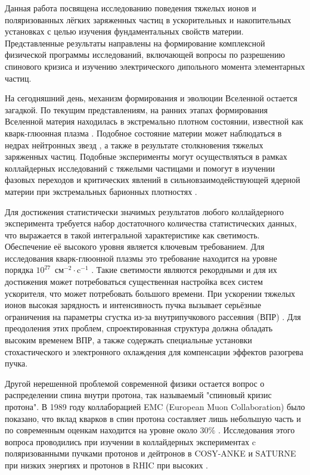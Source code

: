 \par	Данная работа посвящена исследованию поведения тяжелых ионов и поляризованных лёгких заряженных частиц в ускорительных и накопительных установках с целью изучения фундаментальных свойств материи. Представленные результаты направлены на формирование комплексной физической программы исследований, включающей вопросы по разрешению спинового кризиса и изучению электрического дипольного момента элементарных частиц.

\par	На сегодняшний день, механизм формирования и эволюции Вселенной остается загадкой. По текущим представлениям, на ранних этапах формирования Вселенной материя находилась в экстремально плотном состоянии, известной как кварк-глюонная плазма \cite{phase_transition_universe}. Подобное состояние материи может наблюдаться в недрах нейтронных звезд \cite{neutron_stars}, а также в результате столкновения тяжелых заряженных частиц. Подобные эксперименты могут осуществляться в рамках коллайдерных исследований с тяжелыми частицами и помогут в изучении фазовых переходов и критических явлений в сильновзаимодействующей ядерной материи при экстремальных барионных плотностях \cite{quark_gluon}.

\par	Для достижения статистически значимых результатов любого коллайдерного эксперимента требуется набор достаточного количества статистических данных, что выражается в такой интегральной характеристике как светимость. Обеспечение её высокого уровня является ключевым требованием. Для исследования кварк-глюонной плазмы это требование находится на уровне порядка $10^{27}$~$\text{см}^{-2}\cdot\text{c}^{-1}$ \cite{RHIC_luminosity_heavy}. Такие светимости являются рекордными и для их достижения может потребоваться существенная настройка всех систем ускорителя, что может потребовать большого времени. При ускорении тяжелых ионов высокая зарядность и интенсивность пучка вызывает серьёзные ограничения на параметры сгустка из-за внутрипучкового рассеяния (ВПР) \cite{2016_IBS}. Для преодоления этих проблем, спроектированная структура должна обладать высоким временем ВПР, а также содержать специальные установки стохастического и электронного охлаждения для компенсации эффектов разогрева пучка.

\par	Другой нерешенной проблемой современной физики остается вопрос о распределении спина внутри протона, так называемый "спиновый кризис протона". В 1989 году коллаборацией EMC (European Muon Collaboration) \cite{spin_crisis_1989} было показано, что вклад кварков в спин протона составляет лишь небольшую часть и по современным оценкам находится на уровне около 30$\%$ \cite{quarks_overview_2022}. Исследования этого вопроса проводились при изучении в коллайдерных экспериментах c поляризованными пучками протонов и дейтронов в COSY-ANKE \cite{COSY_ANKE} и SATURNE \cite{SATURNE} при низких энергиях и протонов в RHIC при высоких \cite{RHIC_2014}. 

